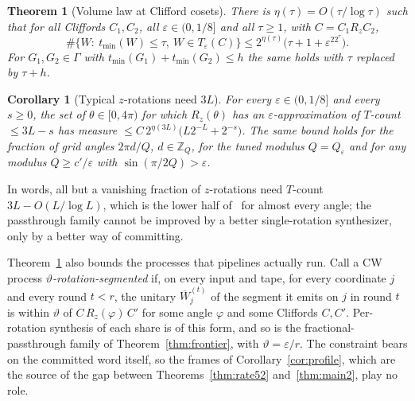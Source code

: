 \documentclass[aps,prx,twocolumn,superscriptaddress,nofootinbib,longbibliography]{revtex4-2}
\theoremstyle{plain}
\newtheorem{theorem}{Theorem}
\newtheorem{corollary}{Corollary}
\theoremstyle{definition}
\theoremstyle{remark}
\newcommand{\Z}{\mathbb{Z}}
\begin{document}
\begin{theorem}[Volume law at Clifford cosets]\label{thm:clifford}
There is $\eta(\tau)=O(\tau/\log\tau)$ such that for all Cliffords $C_1,C_2$, all $\varepsilon\in(0,1/8]$ and all $\tau\ge1$, with $C=C_1R_zC_2$,
\begin{equation}\label{eq:clifford}
\#\{W:\ t_{\min}(W)\le\tau,\ W\in T_\varepsilon(C)\}\le2^{\eta(\tau)}\big(\tau+1+\varepsilon^22^\tau\big).
\end{equation}
For $G_1,G_2\in\Gamma$ with $t_{\min}(G_1)+t_{\min}(G_2)\le h$ the same holds with $\tau$ replaced by $\tau+h$.
\end{theorem}
\begin{corollary}[Typical $z$-rotations need $3L$]\label{cor:typical}
For every $\varepsilon\in(0,1/8]$ and every $s\ge0$, the set of $\theta\in[0,4\pi)$ for which $R_z(\theta)$ has an $\varepsilon$-approximation of $T$-count $\le3L-s$ has measure $\le C\,2^{\eta(3L)}\big(L2^{-L}+2^{-s}\big)$. The same bound holds for the fraction of grid angles $2\pi d/Q$, $d\in\Z_Q$, for the tuned modulus $Q=Q_\varepsilon$ and for any modulus $Q\ge c'/\varepsilon$ with $\sin(\pi/2Q)>\varepsilon$.
\end{corollary}
In words, all but a vanishing fraction of $z$-rotations need $T$-count $3L-O(L/\log L)$, which is the lower half of~\cite[Conj.~8.10]{RossSelinger} for almost every angle; the passthrough family cannot be improved by a better single-rotation synthesizer, only by a better way of committing.


Theorem~\ref{thm:clifford} also bounds the processes that pipelines actually run. Call a CW process \emph{$\vartheta$-rotation-segmented} if, on every input and tape, for every coordinate $j$ and every round $t<r$, the unitary $\overline W^{(t)}_j$ of the segment it emits on $j$ in round $t$ is within $\vartheta$ of $C\,R_z(\varphi)\,C'$ for some angle $\varphi$ and some Cliffords $C,C'$. Per-rotation synthesis of each share is of this form, and so is the fractional-passthrough family of Theorem~\ref{thm:frontier}, with $\vartheta=\varepsilon/r$. The constraint bears on the committed word itself, so the frames of Corollary~\ref{cor:profile}, which are the source of the gap between Theorems~\ref{thm:rate52} and~\ref{thm:main2}, play no role.
\end{document}

